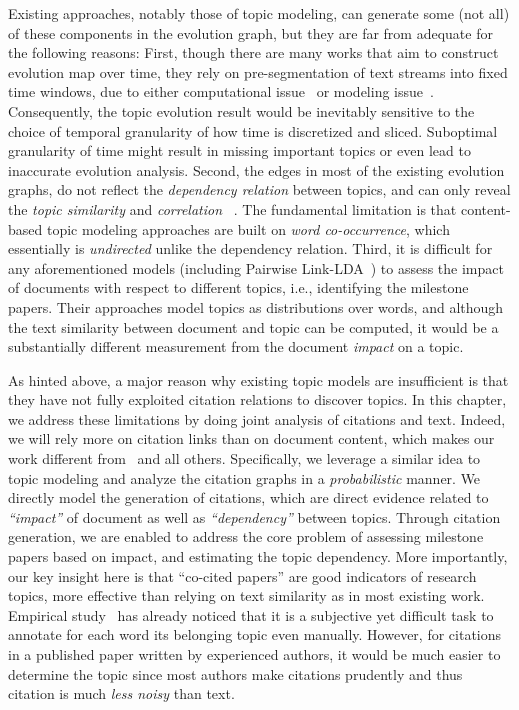 Existing approaches, notably those of topic modeling, can generate some (not
all) of these components in the evolution graph, but they are far from adequate
for the following reasons: First, though there are many works that aim to
construct evolution map over time, they rely on pre-segmentation of text streams
into fixed time windows, due to either computational
issue~\cite{blei2006dynamic,mei2005discovering,wang2006topics} or modeling
issue~\cite{wang2012continuous}. Consequently, the topic evolution result would
be inevitably sensitive to the choice of temporal granularity of how time is
discretized and sliced. Suboptimal granularity of time might result in missing
important topics or even lead to inaccurate evolution analysis.  Second, the
edges in most of the existing evolution graphs, do not reflect the
\emph{dependency relation} between topics, and can only reveal the \emph{topic
similarity} and \emph{correlation}
~\cite{blei2006dynamic,blei2007correlated,mei2005discovering,wang2012continuous}.
The fundamental limitation is that content-based topic modeling approaches are
built on \emph{word co-occurrence}, which essentially is \emph{undirected}
unlike the dependency relation.  Third, it is difficult for any aforementioned
models (including Pairwise Link-LDA~\cite{nallapati2008joint}) to assess the
impact of documents with respect to different topics, i.e., identifying the
milestone papers. Their approaches model topics as distributions over words, and
although the text similarity between document and topic can be computed, it
would be a substantially different measurement from the document \emph{impact}
on a topic.

As hinted above, a major reason why existing topic models are insufficient is
that they have not fully exploited citation relations to discover topics. In
this chapter, we address these limitations by doing joint analysis of citations
and text.  Indeed, we will rely  more on citation links than on document
content, which makes our work different from~\cite{nallapati2008joint} and all
others. Specifically, we leverage a similar idea to topic modeling and analyze
the citation graphs in a \emph{probabilistic} manner. We directly model the
generation of citations, which are direct evidence related to \emph{``impact''}
of document as well as \emph{``dependency''} between topics. Through citation
generation, we are enabled to address the core problem of assessing milestone
papers based on impact, and estimating the topic dependency.  More importantly,
our key insight here is that ``co-cited papers'' are good indicators of research
topics, more effective than relying on text similarity as in most existing work.
Empirical study~\cite{boyd2009reading} has already noticed that it is a
subjective yet difficult task to annotate for each word its belonging topic even
manually. However, for citations in a published paper written by experienced
authors, it would be much easier to determine the topic since most authors make
citations prudently and thus citation is much \emph{less noisy} than text.

